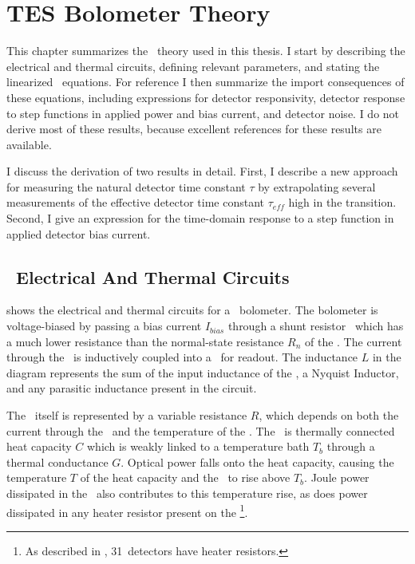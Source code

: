\chapter{TES Bolometer Theory}\label{c:tes}

This chapter summarizes the \TES\ theory used in this thesis.
I start by describing the \TES electrical and thermal circuits, defining relevant parameters, and stating the linearized \TES\ equations.
For reference I then summarize the import consequences of these equations, including expressions for detector responsivity, detector response to step functions in applied power and bias current, and detector noise.
I do not derive most of these results, because excellent references for these results are available\cite{irwin2005transition}.

I discuss the derivation of two results in detail.
First, I describe a new approach for measuring the natural detector time constant $\tau$ by extrapolating several measurements of the effective detector time constant $\tau_{eff}$ high in the transition. 
Second, I give an expression for the time-domain response to a step function in applied detector bias current.

\section{\TES\ Electrical And Thermal Circuits}

 shows the electrical and thermal circuits for a \TES\ bolometer.
The bolometer is voltage-biased by passing a bias current $I_{bias}$ through a shunt resistor \Rsh\ which has a much lower resistance than the normal-state resistance $R_n$ of the \TES.
The current through the \TES\ is inductively coupled into a \SQUID\ for readout.
The inductance $L$ in the diagram represents the sum of the input inductance of the \SQUID, a Nyquist Inductor, and any parasitic inductance present in the circuit.

The \TES\ itself is represented by a variable resistance $R$, which depends on both the current through the \TES\ and the temperature of the \TES.
The \TES\ is thermally connected heat capacity $C$ which is weakly linked to a temperature bath $T_b$ through a thermal conductance $G$.
Optical power falls onto the heat capacity, causing the temperature $T$ of the heat capacity and the \TES\ to rise above $T_b$.
Joule power dissipated in the \TES\ also contributes to this temperature rise, as does power dissipated in any heater resistor present on the \TES\footnote{As described in , 31~detectors have heater resistors.}.


